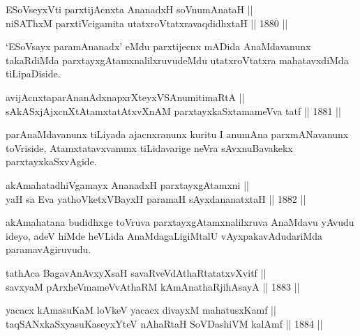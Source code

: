 \begin{shl}
ESoV\s seyxVti parxtijAcnxta AnanadxH soV\s numAnataH || \\
niSAThxM parxtiVcigamita utatxroVtatxravaqdidhxtaH ||  1880 ||  
\end{shl}

\begin{artha}
`ESoV\s sayx paramAnanadx' eMdu parxtijecnx mADida AnaMdavanunx takaRdiMda
parxtayxgAtamxnalilxruvudeMdu utatxroVtatxra mahatavxdiMda tiLipaDiside.
\end{artha}


\begin{shl}
avijAcnxtaparAnanAdxnapxrXteyxVSA\s numitimaRtA ||  \\
sAkASxjAjxcnXtAtamxtatAtxvXnAM parxtayxkaSxtamameVva tatf ||  1881 ||  
\end{shl}

\begin{artha}
parAnaMdavanunx tiLiyada ajacnxranunx kuritu I anumAna parxmANavanunx
toVriside, Atamxtatavxvanunx tiLidavarige neVra sAvxnuBavakekx parxtayxkaSxvAgide.
\end{artha}


\begin{shl}
akAmahatadhiVgamayx AnanadxH parxtayxgAtamxni || \\
yaH sa Eva yathoVketxVBayxH paramaH sAyxdananatxtaH ||  1882 ||  
\end{shl}

\begin{artha}
akAmahatana budidhxge toVruva parxtayxgAtamxnalilxruva AnaMdavu yAvudu
ideyo, adeV hiMde heVLida AnaMdagaLigiMtalU vAyxpakavAdudariMda
paramavAgiruvudu.
\end{artha}


\begin{shl}
tathAca BagavAnAvxyXsaH savaRveVdAthaRtatatxvXvitf || \\
savxyaM pArxheVmameVvAthaRM kAmAnathaRjihAsayA ||  1883 ||  
\end{shl}

\begin{shl}
yacacx kAmasuKaM loVkeV yacacx divayxM mahatusxKamf || \\
taqSANxkaSxyasuKaseyxYteV nAhaRtaH SoVDashiVM kalAmf ||  1884 ||  
\end{shl}

